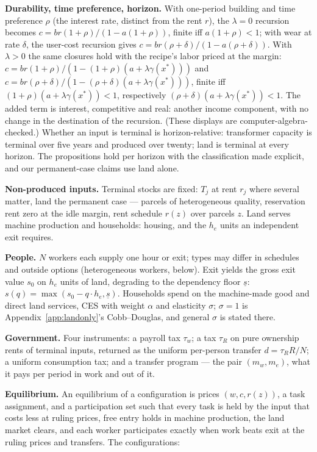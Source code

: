 \documentclass[12pt]{article}
\theoremstyle{plain}
\begin{document}
\textbf{Durability, time preference, horizon.} With one-period building and time preference $\rho$ (the interest rate, distinct from the rent $r$), the $\lambda = 0$ recursion becomes $c = br(1+\rho )/(1 - a(1+\rho ))$, finite iff $a(1+\rho ) < 1$; with wear at rate $\delta$, the user-cost recursion gives $c = br(\rho +\delta )/(1 - a(\rho +\delta ))$. With $\lambda > 0$ the same closures hold with the recipe's labor priced at the margin: $c = br(1+\rho )/(1 - (1+\rho )(a + \lambda \gamma (x^*)))$ and $c = br(\rho +\delta )/(1 - (\rho +\delta )(a + \lambda \gamma (x^*)))$, finite iff $(1+\rho )(a + \lambda \gamma (x^*)) < 1$, respectively $(\rho +\delta )(a + \lambda \gamma (x^*)) < 1$. The added term is interest, competitive and real: another income component, with no change in the destination of the recursion. (These displays are computer-algebra-checked.) Whether an input is terminal is horizon-relative: transformer capacity is terminal over five years and produced over twenty; land is terminal at every horizon. The propositions hold per horizon with the classification made explicit, and our permanent-case claims use land alone.

\textbf{Non-produced inputs.} Terminal stocks are fixed: $T_j$ at rent $r_j$ where several matter, land the permanent case --- parcels of heterogeneous quality, reservation rent zero at the idle margin, rent schedule $r(z)$ over parcels $z$. Land serves machine production and households: housing, and the $h_e$ units an independent exit requires.

\textbf{People.} $N$ workers each supply one hour or exit; types may differ in schedules and outside options (heterogeneous workers, below). Exit yields the gross exit value $s_0$ on $h_e$ units of land, degrading to the dependency floor $\underline{s}$: $s(q) = \max(s_0 - q\cdot h_e, \underline{s})$. Households spend on the machine-made good and direct land services, CES with weight $\alpha$ and elasticity $\sigma$; $\sigma = 1$ is Appendix~\ref{app:landonly}'s Cobb--Douglas, and general $\sigma$ is stated there.

\textbf{Government.} Four instruments: a payroll tax $\tau _w$; a tax $\tau _R$ on pure ownership rents of terminal inputs, returned as the uniform per-person transfer $d = \tau _R R/N$; a uniform consumption tax; and a transfer program --- the pair $(m_w,m_e)$, what it pays per period in work and out of it.

\textbf{Equilibrium.} An equilibrium of a configuration is prices $(w,c,r(z))$, a task assignment, and a participation set such that every task is held by the input that costs less at ruling prices, free entry holds in machine production, the land market clears, and each worker participates exactly when work beats exit at the ruling prices and transfers. The configurations:
\end{document}
